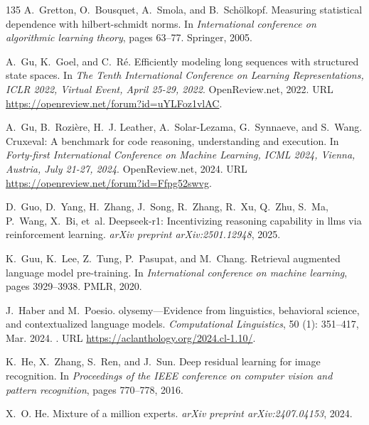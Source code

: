 \begin{thebibliography}{135}
A.~Gretton, O.~Bousquet, A.~Smola, and B.~Sch{\"o}lkopf.
\newblock Measuring statistical dependence with hilbert-schmidt norms.
\newblock In \emph{International conference on algorithmic learning theory},
  pages 63--77. Springer, 2005.

A.~Gu, K.~Goel, and C.~R{\'{e}}.
\newblock Efficiently modeling long sequences with structured state spaces.
\newblock In \emph{The Tenth International Conference on Learning
  Representations, {ICLR} 2022, Virtual Event, April 25-29, 2022}.
  OpenReview.net, 2022.
\newblock URL \url{https://openreview.net/forum?id=uYLFoz1vlAC}.

A.~Gu, B.~Rozi{\`{e}}re, H.~J. Leather, A.~Solar{-}Lezama, G.~Synnaeve, and
  S.~Wang.
\newblock Cruxeval: {A} benchmark for code reasoning, understanding and
  execution.
\newblock In \emph{Forty-first International Conference on Machine Learning,
  {ICML} 2024, Vienna, Austria, July 21-27, 2024}. OpenReview.net, 2024.
\newblock URL \url{https://openreview.net/forum?id=Ffpg52swvg}.

D.~Guo, D.~Yang, H.~Zhang, J.~Song, R.~Zhang, R.~Xu, Q.~Zhu, S.~Ma, P.~Wang,
  X.~Bi, et~al.
\newblock Deepseek-r1: Incentivizing reasoning capability in llms via
  reinforcement learning.
\newblock \emph{arXiv preprint arXiv:2501.12948}, 2025.

K.~Guu, K.~Lee, Z.~Tung, P.~Pasupat, and M.~Chang.
\newblock Retrieval augmented language model pre-training.
\newblock In \emph{International conference on machine learning}, pages
  3929--3938. PMLR, 2020.

J.~Haber and M.~Poesio.
olysemy{---}{E}vidence from linguistics, behavioral science, and
  contextualized language models.
\newblock \emph{Computational Linguistics}, 50 (1): 351--417,
  Mar. 2024.
\newblock {}.
\newblock URL \url{https://aclanthology.org/2024.cl-1.10/}.

K.~He, X.~Zhang, S.~Ren, and J.~Sun.
\newblock Deep residual learning for image recognition.
\newblock In \emph{Proceedings of the IEEE conference on computer vision and
  pattern recognition}, pages 770--778, 2016.

X.~O. He.
\newblock Mixture of a million experts.
\newblock \emph{arXiv preprint arXiv:2407.04153}, 2024.


\end{thebibliography}
